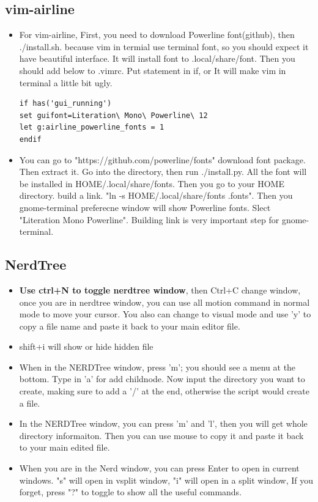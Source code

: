 \documentclass[a4paper,12pt,twoside]{book}
\begin{document}
\begin{itemize}
\subsection{vim-airline} 
\begin{itemize}
\item For vim-airline,  First, you need to download Powerline font(github), then ./install.sh. because vim in termial use terminal font, so you should expect it have beautiful interface. It will install font to .local/share/font. Then you should add below to .vimrc.  Put statement in if, or It will make vim in terminal a little bit ugly. 
\begin{verbatim}
if has('gui_running')
set guifont=Literation\ Mono\ Powerline\ 12   
let g:airline_powerline_fonts = 1
endif
\end{verbatim}
\item You can go to "https://github.com/powerline/fonts" download font package. Then extract it. Go into the directory, then run ./install.py.  All the font will be installed in HOME/.local/share/fonts. Then you go to your HOME directory. build a link. "ln -s HOME/.local/share/fonts .fonts". Then you gnome-terminal preferecne window will show Powerline fonts. Slect "Literation Mono Powerline". Building link is very important step for gnome-terminal. 
\end{itemize}


\subsection{NerdTree}
\begin{itemize}
		
		\item \textbf{Use ctrl+N to toggle nerdtree window}, then Ctrl+C change window, once you are in nerdtree window, you can use all motion command in normal mode to move your cursor. You also can change to visual mode and use 'y' to copy a file name and paste it back to your main editor file.  

		\item shift+i will show or hide hidden file
		\item When in the NERDTree window, press 'm'; you should see a menu at the bottom. Type in 'a' for add childnode. Now input the directory you want to create, making sure to add a '/' at the end, otherwise the script would create a file.
		\item In the NERDTree window, you can press 'm' and 'l', then you will get whole directory informaiton. Then you can use mouse to copy it and paste it back to your main edited file.
		\item When you are in the Nerd window, you can press Enter to open in current windows. "s" will open in vsplit window, "i" will open in a split window, If you forget, press "?" to toggle to show all the useful commands.


\end{itemize}
\end{itemize}
\end{document}
